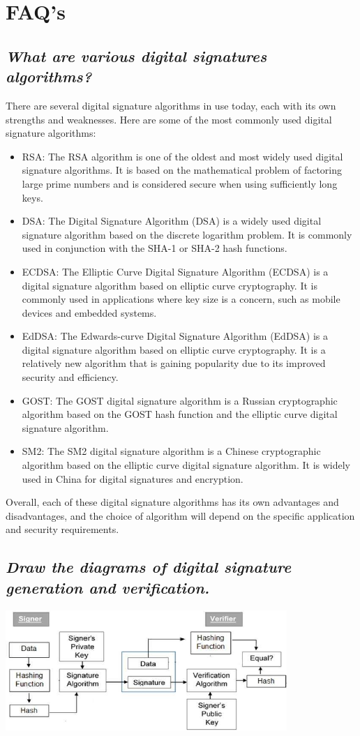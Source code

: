 \documentclass{article}
\begin{document}
\section{\textbf{FAQ's}}
\subsection{\textit{What are various digital signatures algorithms?}}
There are several digital signature algorithms in use today, each with its own strengths and weaknesses. Here are some of the most commonly used digital signature algorithms:
\begin{itemize}
    \item RSA: The RSA algorithm is one of the oldest and most widely used digital signature algorithms. It is based on the mathematical problem of factoring large prime numbers and is considered secure when using sufficiently long keys.
    \item DSA: The Digital Signature Algorithm (DSA) is a widely used digital signature algorithm based on the discrete logarithm problem. It is commonly used in conjunction with the SHA-1 or SHA-2 hash functions.
    \item ECDSA: The Elliptic Curve Digital Signature Algorithm (ECDSA) is a digital signature algorithm based on elliptic curve cryptography. It is commonly used in applications where key size is a concern, such as mobile devices and embedded systems.
    \item EdDSA: The Edwards-curve Digital Signature Algorithm (EdDSA) is a digital signature algorithm based on elliptic curve cryptography. It is a relatively new algorithm that is gaining popularity due to its improved security and efficiency.
    \item GOST: The GOST digital signature algorithm is a Russian cryptographic algorithm based on the GOST hash function and the elliptic curve digital signature algorithm.
    \item SM2: The SM2 digital signature algorithm is a Chinese cryptographic algorithm based on the elliptic curve digital signature algorithm. It is widely used in China for digital signatures and encryption.
\end{itemize}
Overall, each of these digital signature algorithms has its own advantages and disadvantages, and the choice of algorithm will depend on the specific application and security requirements.
\subsection{\textit{Draw the diagrams of digital signature generation and verification.}}
\begin{center}
    \includegraphics[width=0.8\textwidth]{model_digital_signature.jpg}
\end{center}
\end{document}
